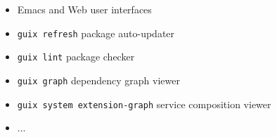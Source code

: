 \documentclass{beamer}
\begin{document}

\begin{frame}
  \Large{
  \begin{itemize}
  \item Emacs and Web user interfaces
  \item \texttt{guix refresh} package auto-updater
  \item \texttt{guix lint} package checker
  \item \texttt{guix graph} dependency graph viewer
  \item \texttt{guix system extension-graph} service composition viewer
  \item ...
  \end{itemize}
  }
\end{frame}

\end{document}
